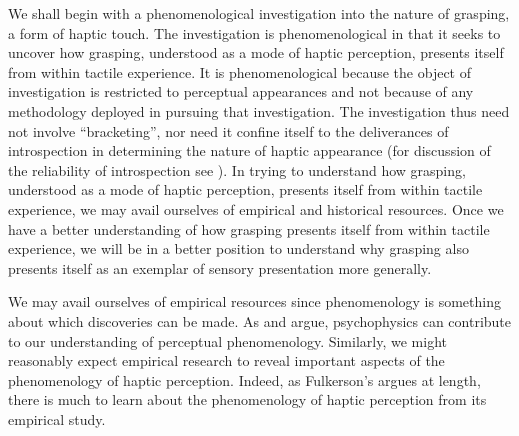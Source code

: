 We shall begin with a phenomenological investigation into the nature of grasping, a form of haptic touch. The investigation is phenomenological in that it seeks to uncover how grasping, understood as a mode of haptic perception, presents itself from within tactile experience. It is phenomenological because the object of investigation is restricted to perceptual appearances and not because of any methodology deployed in pursuing that investigation. The investigation thus need not involve ``bracketing'', nor need it confine itself to the deliverances of introspection in determining the nature of haptic appearance (for discussion of the reliability of introspection see \citealt{Schwitzgebel:2008aa,Bayne:2010ca}). In trying to understand how grasping, understood as a mode of haptic perception, presents itself from within tactile experience, we may avail ourselves of empirical and historical resources. Once we have a better understanding of how grasping presents itself from within tactile experience, we will be in a better position to understand why grasping also presents itself as an exemplar of sensory presentation more generally. 

We may avail ourselves of empirical resources since phenomenology is something about which discoveries can be made. As \citet{Hilbert:2007qy} and \citet{Phillips:2012af} argue, psychophysics can contribute to our understanding of perceptual phenomenology. Similarly, we might reasonably expect empirical research to reveal important aspects of the phenomenology of haptic perception. Indeed, as Fulkerson's \citeyearpar{Fulkerson:2014ek} argues at length, there is much to learn about the phenomenology of haptic perception from its empirical study.


